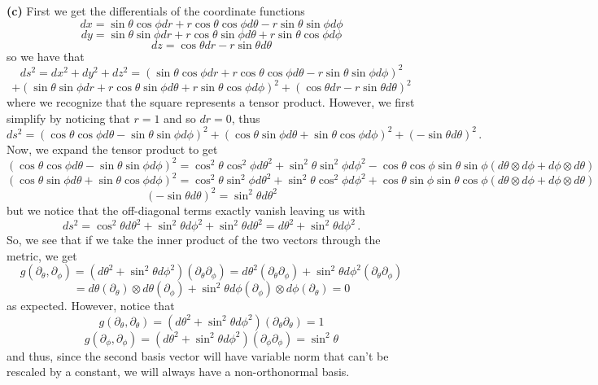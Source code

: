 \documentclass[10pt]{article}
\begin{document}
\textbf{(c)} First we get the differentials of the coordinate functions
\[ dx = \sin\theta\cos\phi dr + r\cos\theta\cos\phi d\theta -r\sin\theta\sin\phi d\phi \]
\[ dy = \sin\theta\sin\phi dr + r\cos\theta\sin\phi d\theta + r\sin\theta\cos\phi d\phi \]
\[ dz = \cos\theta dr - r\sin\theta d\theta \]
so we have that
\[ ds^{2} = dx^{2} + dy^{2} + dz^{2} = \left(\sin\theta\cos\phi dr + r\cos\theta\cos\phi d\theta -r\sin\theta\sin\phi d\phi\right)^{2}\]
\[+ \left(\sin\theta\sin\phi dr + r\cos\theta\sin\phi d\theta + r\sin\theta\cos\phi d\phi\right)^{2} + \left(\cos\theta dr - r\sin\theta d\theta\right)^{2} \]
where we recognize that the square represents a tensor product. However, we first simplify by noticing that $r = 1$ and so $dr = 0$, thus
\[ ds^{2} = \left(\cos\theta\cos\phi d\theta -\sin\theta\sin\phi d\phi\right)^{2} + \left(\cos\theta\sin\phi d\theta + \sin\theta\cos\phi d\phi\right)^{2} + \left(-\sin\theta d\theta\right)^{2} \, . \]
Now, we expand the tensor product to get
\[ \left(\cos\theta\cos\phi d\theta -\sin\theta\sin\phi d\phi\right)^{2} = \cos^{2}\theta\cos^{2}\phi d\theta^{2} + \sin^{2}\theta\sin^{2}\phi d\phi^{2} - \cos\theta\cos\phi\sin\theta\sin\phi (d\theta\otimes d\phi + d\phi \otimes d\theta) \]
\[ \left(\cos\theta\sin\phi d\theta + \sin\theta\cos\phi d\phi\right)^{2} = \cos^{2}\theta\sin^{2}\phi d\theta^{2} + \sin^{2}\theta\cos^{2}\phi d\phi^{2} + \cos\theta\sin\phi\sin\theta\cos\phi(d\theta\otimes d\phi + d\phi\otimes d\theta) \]
\[ \left(-\sin\theta d\theta\right)^{2} = \sin^{2}\theta d\theta^{2} \]
but we notice that the off-diagonal terms exactly vanish leaving us with
\[ ds^{2} = \cos^{2}\theta d\theta^{2} + \sin^{2}\theta d\phi^{2} + \sin^{2}\theta d\theta^{2} = d\theta^{2} + \sin^{2}\theta d\phi^{2}\, .\]
So, we see that if we take the inner product of the two vectors through the metric, we get
\[ g(\partial_{\theta},\partial_{\phi}) = (d\theta^{2} + \sin^{2}\theta d\phi^{2})(\partial_{\theta}\partial_{\phi}) = d\theta^{2}(\partial_{\theta}\partial_{\phi}) + \sin^{2}\theta d\phi^{2}(\partial_{\theta}\partial_{\phi})\]
\[ = d\theta(\partial_{\theta})\otimes d\theta(\partial_{\phi}) + \sin^{2}\theta d\phi(\partial_{\phi})\otimes d\phi(\partial_{\theta}) = 0 \]
as expected. However, notice that
\[ g(\partial_{\theta},\partial_{\theta}) = (d\theta^{2} + \sin^{2}\theta d\phi^{2})(\partial_{\theta}\partial_{\theta}) = 1 \]
\[ g(\partial_{\phi},\partial_{\phi}) = (d\theta^{2} + \sin^{2}\theta d\phi^{2})(\partial_{\phi}\partial_{\phi}) = \sin^{2}\theta \]
and thus, since the second basis vector will have variable norm that can't be rescaled by a constant, we will always have a non-orthonormal basis.
\end{document}
